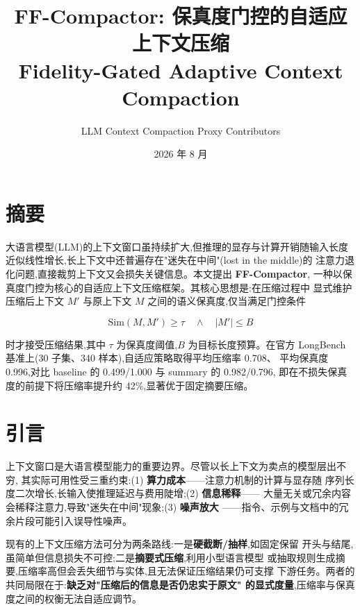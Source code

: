\documentclass[11pt,a4paper]{article}
\title{\textbf{FF-Compactor: 保真度门控的自适应上下文压缩}\\[0.3em]
\large Fidelity-Gated Adaptive Context Compaction}
\author{LLM Context Compaction Proxy Contributors}
\date{2026 年 8 月}
\begin{document}
\maketitle

\section{摘要}

大语言模型(LLM)的上下文窗口虽持续扩大,但推理的显存与计算开销随输入长度
近似线性增长,长上下文中还普遍存在"迷失在中间"(lost in the middle)的
注意力退化问题,直接裁剪上下文又会损失关键信息。本文提出 \textbf{FF-Compactor},
一种以保真度门控为核心的自适应上下文压缩框架。其核心思想是:在压缩过程中
显式维护压缩后上下文 $M'$ 与原上下文 $M$ 之间的语义保真度,仅当满足门控条件

\begin{equation}
  \mathrm{Sim}(M, M') \ge \tau \quad \wedge \quad |M'| \le B
\end{equation}

时才接受压缩结果,其中 $\tau$ 为保真度阈值,$B$ 为目标长度预算。在官方
LongBench 基准上(30 子集、340 样本),自适应策略取得平均压缩率 0.708、
平均保真度 0.996,对比 baseline 的 0.499/1.000 与 summary 的 0.982/0.796,
即在不损失保真度的前提下将压缩率提升约 42\%,显著优于固定摘要压缩。

\section{引言}

上下文窗口是大语言模型能力的重要边界。尽管以长上下文为卖点的模型层出不穷,
其实际可用性受三重约束:(1) \textbf{算力成本}——注意力机制的计算与显存随
序列长度二次增长,长输入使推理延迟与费用陡增;(2) \textbf{信息稀释}——
大量无关或冗余内容会稀释注意力,导致"迷失在中间"现象;(3) \textbf{噪声放大}
——指令、示例与文档中的冗余片段可能引入误导性噪声。

现有的上下文压缩方法可分为两条路线:一是\textbf{硬截断/抽样},如固定保留
开头与结尾,虽简单但信息损失不可控;二是\textbf{摘要式压缩},利用小型语言模型
或抽取规则生成摘要,压缩率高但会丢失细节与实体,且无法保证压缩结果仍可支撑
下游任务。两者的共同局限在于:\textbf{缺乏对"压缩后的信息是否仍忠实于原文"
的显式度量},压缩率与保真度之间的权衡无法自适应调节。
\end{document}
